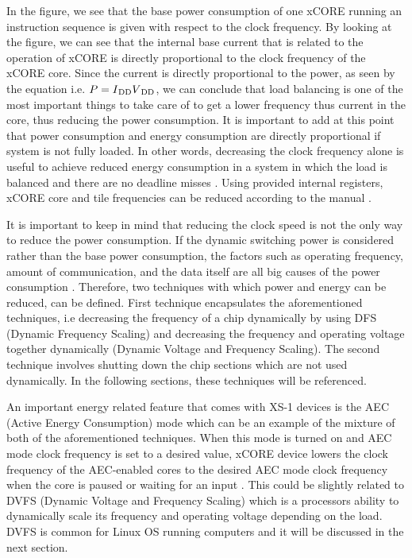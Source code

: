 In the figure, we see that the base power consumption of one xCORE running an instruction sequence is given with respect to the clock frequency. By looking at the figure, we can see that the internal base current that is related to the operation of xCORE is directly proportional to the clock frequency of the xCORE core. Since the current is directly proportional to the power, as seen by the equation i.e. $P = {I\textsubscript{DD}}  {V\textsubscript{DD}}$, we can conclude that load balancing is one of the most important things to take care of to get a lower frequency thus current in the core, thus reducing the power consumption. It is important to add at this point that power consumption and energy consumption are directly proportional if system is not fully loaded. In other words, decreasing the clock frequency alone is useful to achieve reduced energy consumption in a system in which the load is balanced and there are no deadline misses \cite{dvfspaper}. Using provided internal registers, xCORE core and tile frequencies can be reduced according to the manual \cite{xs1energymanual}. 

It is important to keep in mind that reducing the clock speed is not the only way to reduce the power consumption. If the dynamic switching power is considered rather than the base power consumption, the factors such as operating frequency, amount of communication, and the data itself are all big causes of the power consumption \cite{xs1energymanual}. Therefore, two techniques with which power and energy can be reduced, can be defined. First technique encapsulates the aforementioned techniques, i.e decreasing the frequency of a chip dynamically by using DFS (Dynamic Frequency Scaling) and decreasing the frequency and operating voltage together dynamically (Dynamic Voltage and Frequency Scaling). The second technique involves shutting down the chip sections which are not used dynamically. In the following sections, these techniques will be referenced.

An important energy related feature that comes with XS-1 devices is the AEC (Active Energy Consumption) mode \cite{xs1energymanual} which can be an example of the mixture of both of the aforementioned techniques. When this mode is turned on and AEC mode clock frequency is set to a desired value, xCORE device lowers the clock frequency of the AEC-enabled cores to the desired AEC mode clock frequency when the core is paused or waiting for an input \cite{xs1energymanual}. This could be slightly related to DVFS (Dynamic Voltage and Frequency Scaling) \cite{dvfsieee} which is a processors ability to dynamically scale its frequency and operating voltage depending on the load. DVFS is common for Linux OS running computers and it will be discussed in the next section.

